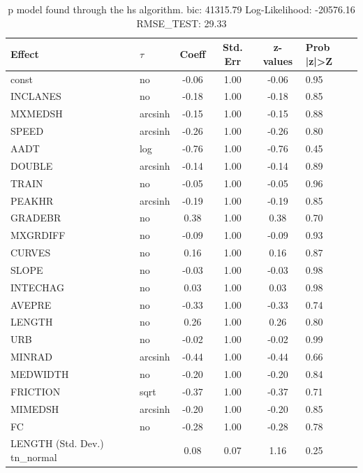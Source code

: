 \begin{table}
	\caption{p model found through the hs algorithm. bic: 41315.79 Log-Likelihood: -20576.16 RMSE_TEST: 29.33}
	\begin{center}
		\begin{tabular}{|l|l|c|c|c|l|}
			\hline
			Effect & $\tau$ & Coeff & Std. Err & z-values & Prob |z|>Z \\
			\hline
			const & no & -0.06 & 1.00 & -0.06 & 0.95 \\
			\hline
			INCLANES & no & -0.18 & 1.00 & -0.18 & 0.85 \\
			\hline
			MXMEDSH & arcsinh & -0.15 & 1.00 & -0.15 & 0.88 \\
			\hline
			SPEED & arcsinh & -0.26 & 1.00 & -0.26 & 0.80 \\
			\hline
			AADT & log & -0.76 & 1.00 & -0.76 & 0.45 \\
			\hline
			DOUBLE & arcsinh & -0.14 & 1.00 & -0.14 & 0.89 \\
			\hline
			TRAIN & no & -0.05 & 1.00 & -0.05 & 0.96 \\
			\hline
			PEAKHR & arcsinh & -0.19 & 1.00 & -0.19 & 0.85 \\
			\hline
			GRADEBR & no & 0.38 & 1.00 & 0.38 & 0.70 \\
			\hline
			MXGRDIFF & no & -0.09 & 1.00 & -0.09 & 0.93 \\
			\hline
			CURVES & no & 0.16 & 1.00 & 0.16 & 0.87 \\
			\hline
			SLOPE & no & -0.03 & 1.00 & -0.03 & 0.98 \\
			\hline
			INTECHAG & no & 0.03 & 1.00 & 0.03 & 0.98 \\
			\hline
			AVEPRE & no & -0.33 & 1.00 & -0.33 & 0.74 \\
			\hline
			LENGTH & no & 0.26 & 1.00 & 0.26 & 0.80 \\
			\hline
			URB & no & -0.02 & 1.00 & -0.02 & 0.99 \\
			\hline
			MINRAD & arcsinh & -0.44 & 1.00 & -0.44 & 0.66 \\
			\hline
			MEDWIDTH & no & -0.20 & 1.00 & -0.20 & 0.84 \\
			\hline
			FRICTION & sqrt & -0.37 & 1.00 & -0.37 & 0.71 \\
			\hline
			MIMEDSH & arcsinh & -0.20 & 1.00 & -0.20 & 0.85 \\
			\hline
			FC & no & -0.28 & 1.00 & -0.28 & 0.78 \\
			\hline
			LENGTH (Std. Dev.) tn_normal &  & 0.08 & 0.07 & 1.16 & 0.25 \\

\end{tabular}
\end{center}
\end{table}
